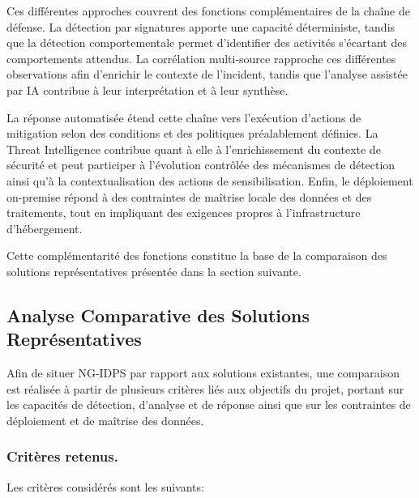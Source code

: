 Ces différentes approches couvrent des fonctions complémentaires de la chaîne de défense. La détection par signatures apporte une capacité déterministe, tandis que la détection comportementale permet d'identifier des activités s'écartant des comportements attendus. La corrélation multi-source rapproche ces différentes observations afin d'enrichir le contexte de l'incident, tandis que l'analyse assistée par IA contribue à leur interprétation et à leur synthèse.

La réponse automatisée étend cette chaîne vers l'exécution d'actions de mitigation selon des conditions et des politiques préalablement définies. La Threat Intelligence contribue quant à elle à l'enrichissement du contexte de sécurité et peut participer à l'évolution contrôlée des mécanismes de détection ainsi qu'à la contextualisation des actions de sensibilisation. Enfin, le déploiement on-premise répond à des contraintes de maîtrise locale des données et des traitements, tout en impliquant des exigences propres à l'infrastructure d'hébergement.

Cette complémentarité des fonctions constitue la base de la comparaison des solutions représentatives présentée dans la section suivante.

\subsection{Analyse Comparative des Solutions Représentatives}
Afin de situer NG-IDPS par rapport aux solutions existantes, une
comparaison est réalisée à partir de plusieurs critères liés aux objectifs
du projet, portant sur les capacités de détection, d'analyse et de réponse
ainsi que sur les contraintes de déploiement et de maîtrise des données.

\subsubsection{Critères retenus.}

Les critères considérés sont les suivants:


